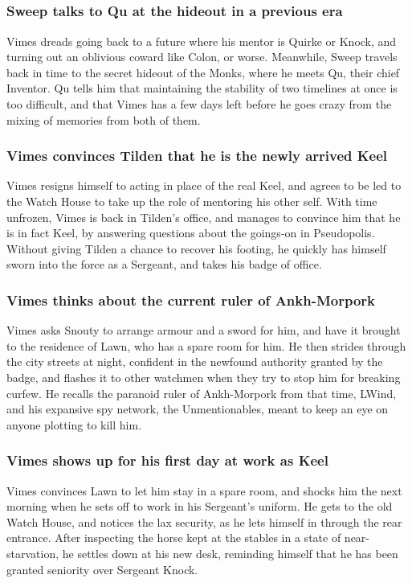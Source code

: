 \subsection{}
\subsubsection{\Gls{Sweep} talks to \Gls{Qu} at the hideout in a previous era}
\Gls{Vimes} dreads going back to a future where his mentor is \Gls{Quirke} or \Gls{Knock}, and
turning out an oblivious coward like \Gls{Colon}, or worse. Meanwhile, \Gls{Sweep} travels back in
time to the secret hideout of the Monks, where he meets \Gls{Qu}, their chief Inventor. \Gls{Qu}
tells him that maintaining the stability of two timelines at once is too difficult, and that
\Gls{Vimes} has a few days left before he goes crazy from the mixing of memories from both
of them.

\subsubsection{\Gls{Vimes} convinces \Gls{Tilden} that he is the newly arrived \Gls{Keel}}
\Gls{Vimes} resigns himself to acting in place of the real \Gls{Keel}, and agrees to be led to the
Watch House to take up the role of mentoring his other self. With time unfrozen, \Gls{Vimes} is
back in \Gls{Tilden}'s office, and manages to convince him that he is in fact \Gls{Keel}, by
answering questions about the goings-on in Pseudopolis. Without giving \Gls{Tilden} a chance to
recover his footing, he quickly has himself sworn into the force as a Sergeant, and takes his badge
of office.

\subsubsection{\Gls{Vimes} thinks about the current ruler of Ankh-Morpork}
\Gls{Vimes} asks \Gls{Snouty} to arrange armour and a sword for him, and have it brought to the
residence of \Gls{Lawn}, who has a spare room for him. He then strides through the city streets at
night, confident in the newfound authority granted by the badge, and flashes it to other watchmen
when they try to stop him for breaking curfew. He recalls the paranoid ruler of Ankh-Morpork from
that time, \Gls{LWind}, and his expansive spy network, the Unmentionables, meant to keep an eye on
anyone plotting to kill him.

\subsubsection{\Gls{Vimes} shows up for his first day at work as \Gls{Keel}}
\Gls{Vimes} convinces \Gls{Lawn} to let him stay in a spare room, and shocks him the next morning
when he sets off to work in his Sergeant's uniform. He gets to the old Watch House, and notices
the lax security, as he lets himself in through the rear entrance. After inspecting the horse
kept at the stables in a state of near-starvation, he settles down at his new desk, reminding
himself that he has been granted seniority over Sergeant \Gls{Knock}.

